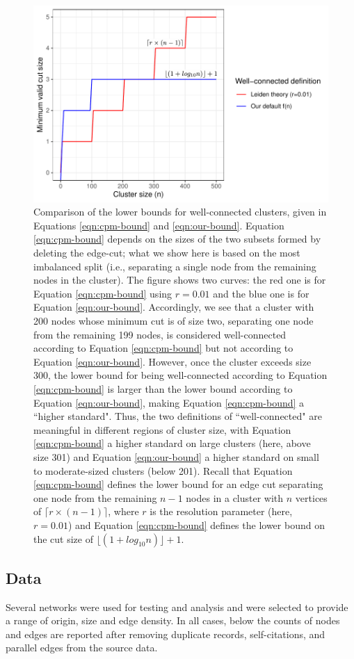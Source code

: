 \documentclass[11pt]{article}   	%
\begin{document}
\begin{figure}[H]
\centering
\includegraphics[width=0.7\linewidth]{figs/well_connected_definition.pdf}
\caption{Comparison of  the  lower bounds for well-connected clusters,  given in Equations \ref{eqn:cpm-bound} and \ref{eqn:our-bound}. 
Equation \ref{eqn:cpm-bound} depends on the sizes of the two subsets formed by deleting the edge-cut; what we show here is based on the most imbalanced split (i.e., separating a single node from the remaining nodes in the cluster).   
The figure shows two curves: the red one is for Equation \ref{eqn:cpm-bound} using $r=0.01$ and the blue one is for Equation \ref{eqn:our-bound}. 
Accordingly, we see that a cluster with 200 nodes whose minimum cut is of size two, separating one node from the remaining 199 nodes, is considered well-connected
according to Equation \ref{eqn:cpm-bound}  but not according to Equation \ref{eqn:our-bound}.  However, once the cluster exceeds size 300, the lower bound for being well-connected according to 
Equation \ref{eqn:cpm-bound}   is larger than the lower bound according to Equation \ref{eqn:our-bound}, making
Equation \ref{eqn:cpm-bound} a ``higher standard". 
Thus, the two definitions of ``well-connected"  are meaningful in different
regions of cluster size, with Equation \ref{eqn:cpm-bound}  a higher standard on large clusters (here, above size 301) and Equation \ref{eqn:our-bound}   a higher standard on small to moderate-sized clusters (below 201).
Recall that Equation \ref{eqn:cpm-bound}  defines the lower bound for an edge cut separating one node from the remaining $n-1$ nodes
  in a cluster with $n$ vertices of $\lceil r \times (n-1) \rceil$, where $r$ is the resolution parameter (here, $r=0.01$)
and Equation \ref{eqn:cpm-bound} defines the lower bound on the cut size of $\lfloor(1 + log_{10}n)\rfloor +1$.}
\end{figure}

 \subsection{Data} Several networks were used for testing and analysis and were selected to provide a range of origin, size and edge density. In all cases, below the counts of nodes and edges are reported after removing duplicate records,
self-citations, and parallel edges from the source data.
\end{document}
